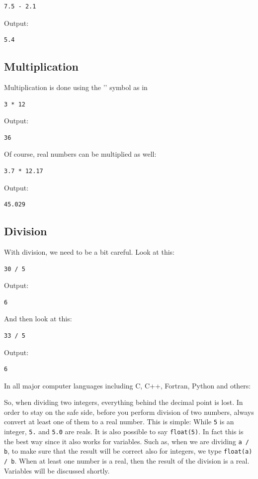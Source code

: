\documentclass[article,A4,12pt]{llncs}
\begin{document}
\begin{verbatim}
7.5 - 2.1
\end{verbatim}
Output:

\begin{verbatim}
5.4
\end{verbatim}
\subsection{Multiplication}
Multiplication is done using the '{\tt *}' symbol as in

\begin{verbatim}
3 * 12
\end{verbatim}
Output:

\begin{verbatim}
36
\end{verbatim}
Of course, real numbers can be multiplied as well:

\begin{verbatim}
3.7 * 12.17
\end{verbatim}
Output:

\begin{verbatim}
45.029
\end{verbatim}
\subsection{Division}
With division, we need to be a bit careful. Look at this:

\begin{verbatim}
30 / 5
\end{verbatim}
Output:

\begin{verbatim}
6
\end{verbatim}
And then look at this:

\begin{verbatim}
33 / 5
\end{verbatim}
Output:

\begin{verbatim}
6
\end{verbatim}
In all major computer languages including C, C++, Fortran, Python and 
others:\\

\begin{center}
\end{center}

\vspace{4mm}
\noindent
So, when dividing two integers, everything behind the decimal point is lost.
In order to stay on the safe side, 
before you perform division of two numbers, always convert at least one of them
to a real number. This is simple: While {\tt 5} is an integer, {\tt 5.}
and {\tt 5.0} are reals. It is also possible to 
say {\tt float(5)}. In fact this is the best way since it also works for 
variables. Such as, when we are dividing {\tt a / b}, to make sure that 
the result will be correct also for integers, we type {\tt float(a) / b}. 
When at least one number is a real, then the result of the division is a real.   
Variables will be discussed shortly.
\end{document}

